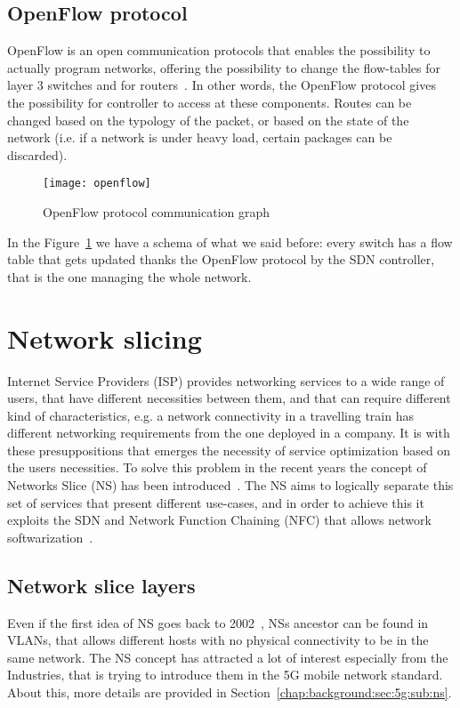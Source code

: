 \subsection{OpenFlow protocol}
OpenFlow is an open communication protocols that enables the possibility to
actually program networks, offering the possibility to change the flow-tables
for layer 3 switches and for routers~\cite{mckeown2008openflow}. In other words,
the OpenFlow protocol gives the possibility for controller to access at these
components. Routes can be changed based on the typology of the packet, or based
on the state of the network (i.e. if a network is under heavy load, certain
packages can be discarded).

\begin{figure}[t]
 \centering
 \texttt{[image: openflow]}
 \caption{OpenFlow protocol communication graph}
 \label{chap:background:img:openflow_protocol}
\end{figure}

In the Figure~\ref{chap:background:img:openflow_protocol} we have a schema of
what we said before: every switch has a flow table that gets updated thanks the
OpenFlow protocol by the SDN controller, that is the one managing the whole
network.

\section{Network slicing}
Internet Service Providers (ISP) provides networking services to a wide range of
users, that have different necessities between them, and that can require
different kind of characteristics, e.g. a network connectivity in a travelling
train has different networking requirements from the one deployed in a company.
It is with these presuppositions that emerges the necessity of service
optimization based on the users necessities. To solve this problem in the recent
years the concept of Networks Slice (NS) has been
introduced~\cite{alliance20155g}. The NS aims to logically separate this set of
services that present different use-cases, and in order to achieve this it
exploits the SDN and Network Function Chaining (NFC) that allows network
softwarization~\cite{ordonez2017network}.

\subsection{Network slice layers}

Even if the first idea of NS goes back to 2002~\cite{peterson2003blueprint}, NSs
ancestor can be found in VLANs, that allows different hosts with no physical
connectivity to be in the same network. The NS concept has attracted a lot of
interest especially from the Industries, that is trying to introduce them in the
5G mobile network standard. About this, more details are provided in
Section~\ref{chap:background:sec:5g:sub:ns}.

